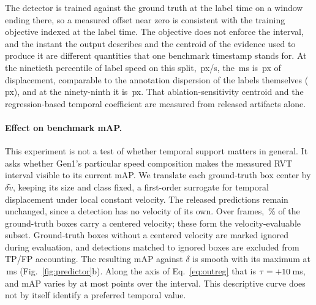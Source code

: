 \documentclass[10pt,twocolumn,letterpaper]{article}
\begin{document}
The detector is trained against the ground truth at the label time on a window
ending there, so a measured offset near zero is consistent with the training
objective indexed at the label time. The objective
does not enforce the
interval, and the instant the output describes and the centroid of the evidence
used to produce it are different quantities that one benchmark timestamp stands
for. At the ninetieth percentile of label speed on this split, \outSpeedNinety\,px/s, the
\rvtCentroidMagMeas\,ms is \outPxNinety\,px of displacement, comparable to the
annotation dispersion of the labels themselves (\,px), and at the
ninety-ninth it is \outPxNinetynine\,px. That ablation-sensitivity centroid and
the regression-based temporal coefficient are measured from released artifacts alone.


\paragraph{Effect on benchmark mAP.}
This experiment is not a test of whether temporal support matters in general. It asks whether
Gen1's particular speed composition makes the measured RVT interval visible to its current mAP.
We translate each ground-truth box
center by $\delta\tilde v$, keeping its size and class fixed, a
first-order surrogate for temporal displacement under local constant velocity.
The released predictions remain unchanged, since a detection
has no velocity of its own. Over \mapFrames{} frames, \mapGTvelPct\,\% of the \mapGT{}
ground-truth boxes carry a centered velocity; these form the velocity-evaluable subset. Ground-truth
boxes without a centered velocity are marked ignored during evaluation, and detections
matched to ignored boxes are excluded from TP/FP accounting. The resulting mAP against
$\delta$ is smooth with its maximum at \mapArgmax\,ms
(Fig.~\ref{fig:predictor}b). Along the axis of Eq.~\ref{eq:outreg} that is
$\tau=+10$\,ms, and mAP varies by at most \mapCost{} points over the
interval. This descriptive curve does not by itself identify a preferred temporal
value.
\end{document}
